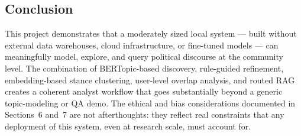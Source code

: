 \documentclass[11pt,a4paper]{article}
\begin{document}
\subsection{Conclusion}

This project demonstrates that a moderately sized local system --- built without external data warehouses, cloud infrastructure, or fine-tuned models --- can meaningfully model, explore, and query political discourse at the community level. The combination of BERTopic-based discovery, rule-guided refinement, embedding-based stance clustering, user-level overlap analysis, and routed RAG creates a coherent analyst workflow that goes substantially beyond a generic topic-modeling or QA demo. The ethical and bias considerations documented in Sections~6 and~7 are not afterthoughts: they reflect real constraints that any deployment of this system, even at research scale, must account for.
\end{document}
